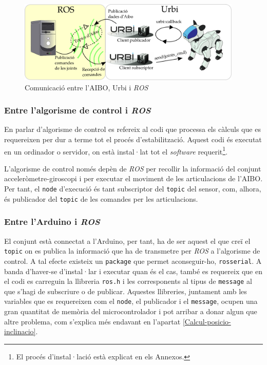 \documentclass[12pt,a4paper,final,twoside]{article}
\begin{document}
\begin{figure}[tb]
\centering
\includegraphics[width=0.95\textwidth]{Imatges/Comunicacio-ROS-Urbi-Aibo.pdf}
\caption{Comunicació entre l'AIBO, Urbi i \textit{ROS}}
\label{fig:Comunicacio-ROS-Urbi-AIBO}
\end{figure}


\subsubsection{Entre l'algorisme de control i \textit{ROS}}

En parlar d'algorisme de control es refereix al codi que processa els càlculs que es requereixen per dur a terme tot el procés d'estabilització. Aquest codi és executat en un ordinador o servidor, on està instal·lat tot el \textit{software} requerit\footnote{El procés d'instal·lació està explicat en els Annexos.}. 

L'algorisme de control només depèn de \textit{ROS} per recollir la informació del conjunt acceleròmetre-giroscopi i per executar el moviment de les articulacions de l'AIBO. Per tant, el \texttt{node} d'execució és tant subscriptor del \texttt{topic} del sensor, com, alhora, és publicador del \texttt{topic} de les comandes per les articulacions.


\subsubsection{Entre l'Arduino i \textit{ROS}}
\label{comunicacio-ROS-Arduino}


El conjunt està connectat a l'Arduino, per tant, ha de ser aquest el que creï el \texttt{topic} on es publica la informació que ha de transmetre per \textit{ROS} a l'algorisme de control. A tal efecte existeix un \texttt{package} que permet aconseguir-ho, \texttt{rosserial}. A banda d'haver-se d'instal·lar i executar quan és el cas, també es requereix que en el codi es carreguin la llibreria \texttt{ros.h} i les corresponents al tipus de \texttt{message} al que s'hagi de subscriure o de publicar. Aquestes llibreries, juntament amb les variables que es requereixen com el \texttt{node}, el publicador i el \texttt{message}, ocupen una gran quantitat de memòria del microcontrolador i pot arribar a donar algun que altre problema, com s'explica més endavant en l'apartat \ref{Calcul-posicio-inclinacio}. 
\end{document}
